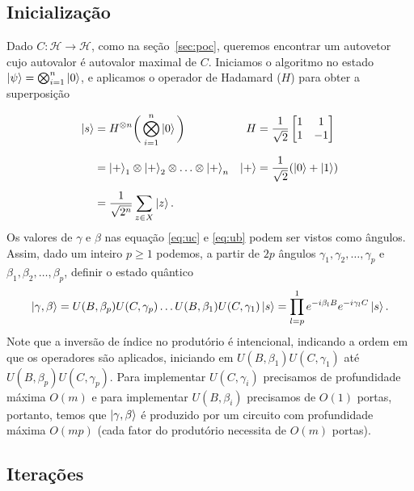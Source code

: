 \subsection{Inicialização}

Dado $C:\mathcal{H}\to \mathcal{H}$, como na seção~\ref{sec:poc}, queremos encontrar um autovetor cujo autovalor é autovalor maximal de $C$. Iniciamos o algoritmo no estado $\ket{\psi} = \bigotimes_{i=1}^n\ket{0}$, e aplicamos o operador de Hadamard ($H$) para obter a superposição

\begin{align}\label{eq:qaoas}
    \ket{s}
    &= H^{\otimes n}\bigg(\bigotimes_{i=1}^n \ket{0}\bigg)
    & H &= \frac{1}{\sqrt{2}}
    \begin{bmatrix}
    1 & 1 \\
    1 & -1
    \end{bmatrix} \\[0.5em]
    &= \ket{+}_1 \otimes \ket{+}_2 \otimes \dotso \otimes \ket{+}_n
    & \ket{+} &= \frac{1}{\sqrt{2}}(\ket{0} + \ket{1}) \\[0.5em]
    &= \frac{1}{\sqrt{2^n}} \sum_{z \in X} \ket{z}.
\end{align}
Os valores de $\gamma$ e $\beta$ nas equação \eqref{eq:uc} e \eqref{eq:ub} podem ser vistos como ângulos. Assim, dado um inteiro $p\geq 1$ podemos, a partir de $2p$ ângulos $\gamma_1, \gamma_2, \dotso, \gamma_p$ e $\beta_1, \beta_2,\dotso, \beta_p$, definir o estado quântico
\begin{equation}\label{eq:gammabeta}
\ket{\gamma, \beta} = U(B, \beta_p)U(C, \gamma_p) \dotso U(B, \beta_1)U(C, \gamma_1)\ket{s} = \prod_{l=p}^1 e^{-i\beta_lB}e^{-i\gamma_lC}\ket{s}.
\end{equation}
Note que a inversão de índice no produtório é intencional, indicando a ordem em que os operadores são aplicados, iniciando em $U(B, \beta_1)U(C, \gamma_1)$ até $U(B, \beta_p)U(C, \gamma_p)$. Para implementar $U(C, \gamma_i)$ precisamos de profundidade máxima $O(m)$ e para implementar $U(B, \beta_i)$ precisamos de $O(1)$ portas, portanto, temos que $\ket{\gamma, \beta}$ é produzido por um circuito com profundidade máxima $O(mp)$ (cada fator do produtório necessita de $O(m)$ portas).

\subsection{Iterações}

